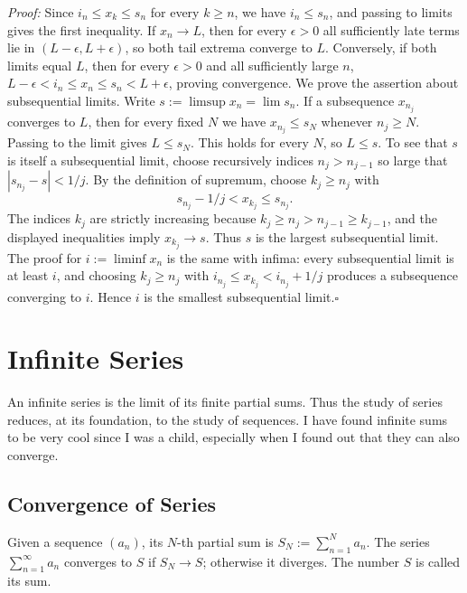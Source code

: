 \documentclass[a4paper,11pt,abstracton]{scrartcl}
\theoremstyle{dotlessP}
\theoremstyle{dotlessS}
\theoremstyle{remark}
\theoremstyle{definition}
\begin{document}
\begin{claim_box}
\textit{Proof:} Since $i_n\le x_k\le s_n$ for every $k\ge n$,
we have $i_n\le s_n$, and passing to limits gives the first inequality.
If $x_n\to L$, then for every $\epsilon>0$ all sufficiently late terms
lie in $(L-\epsilon,L+\epsilon)$, so both tail extrema converge to $L$.
Conversely, if both limits equal $L$, then for every $\epsilon>0$ and
all sufficiently large $n$,
$L-\epsilon<i_n\le x_n\le s_n<L+\epsilon$, proving convergence.
We prove the assertion about subsequential limits. Write
$s:=\limsup x_n=\lim s_n$. If a subsequence $x_{n_j}$ converges to
$L$, then for every fixed $N$ we have $x_{n_j}\le s_N$ whenever
$n_j\ge N$. Passing to the limit gives $L\le s_N$. This holds for
every $N$, so $L\le s$. To see that $s$ is itself a subsequential
limit, choose recursively indices $n_j>n_{j-1}$ so large that
$|s_{n_j}-s|<1/j$. By the definition of supremum, choose
$k_j\ge n_j$ with
\[
 s_{n_j}-1/j<x_{k_j}\le s_{n_j}.
\]
The indices $k_j$ are strictly increasing because
$k_j\ge n_j>n_{j-1}\ge k_{j-1}$, and the displayed inequalities
imply $x_{k_j}\to s$. Thus $s$ is the largest subsequential limit.
The proof for $i:=\liminf x_n$ is the same with infima: every
subsequential limit is at least $i$, and choosing
$k_j\ge n_j$ with $i_{n_j}\le x_{k_j}<i_{n_j}+1/j$ produces a
subsequence converging to $i$. Hence $i$ is the smallest
subsequential limit.\hfill$\square$
\end{claim_box}

\section{Infinite Series}

An infinite series is the limit of its finite partial sums. Thus the
study of series reduces, at its foundation, to the study of sequences. I have found infinite sums to be very cool since I was a child, especially when I found out that they can also converge.

\subsection{Convergence of Series}

\begin{definition_box}
Given a sequence $(a_n)$, its $N$-th partial sum is
$S_N:=\sum_{n=1}^N a_n$. The series $\sum_{n=1}^{\infty}a_n$
converges to $S$ if $S_N\to S$; otherwise it diverges. The number $S$
is called its sum.
\end{definition_box}
\end{document}
